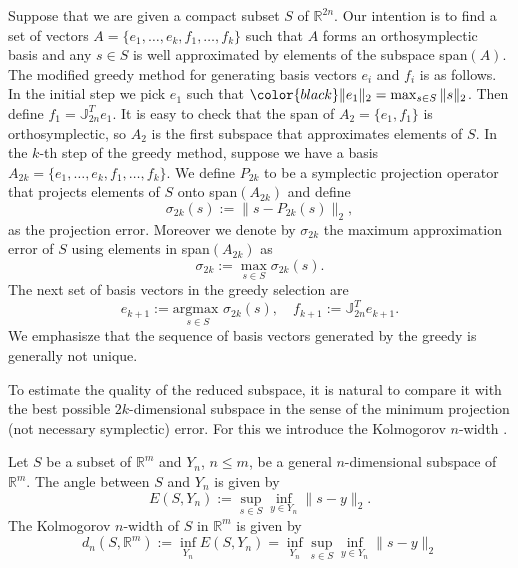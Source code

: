 \documentclass[final]{siamart}
\begin{document}
Suppose that we are given a compact subset $S$ of $\mathbb R^{2n}$. Our intention is to find a set of vectors $A=\{e_1,\dots,e_k,f_1,\dots,f_k\}$ such that $A$ forms {{\color{black}} an orthosymplectic} basis and any $s\in S$ is well approximated by elements of the subspace span$(A)$. The modified greedy method for generating basis vectors $e_i$ and $f_i$ is as follows. In the initial step we pick $e_1$ such that ${\color{black}} \|e_1\|_2 = \max_{s\in S} \|s\|_2$. Then define $f_1 = \mathbb{J}_{2n}^T e_1$. It is easy to check that the span of $A_2 = \{e_1,f_1\}$ is {{\color{black}} orthosymplectic}, so $A_2$ is the first subspace that approximates elements of $S$. In the $k$-th step of the greedy method, suppose we have a basis $A_{2k} = \{ e_1,\dots, e_k , f_1,\dots ,f_k \}$. We define $P_{2k}$ to be a symplectic projection operator that projects elements of $S$ onto span$(A_{2k})$ and define
\begin{equation} \label{eq:new1}
	\sigma_{2k}(s) := \|s-P_{2k}(s)\|_2,
\end{equation}
as the projection error. Moreover we denote by $\sigma_{2k}$ the maximum approximation error of $S$ using elements in span$(A_{2k})$ as
\begin{equation} \label{eq:new2}
	\sigma_{2k} := \max_{s\in S} \sigma_{2k}(s).
\end{equation}
The next set of basis vectors in the greedy selection are
\begin{equation} \label{eq:new3}
	e_{k+1} := \underset{s\in S}{\text{argmax }}\sigma_{2k}(s), \quad f_{k+1} := \mathbb{J}_{2n}^T e_{k+1}.
\end{equation}
We emphasisze that the sequence of basis vectors generated by the greedy is generally not unique. 

To estimate the quality of the reduced subspace, it is natural to compare it with the best possible $2k$-dimensional subspace in the sense of the minimum projection (not necessary symplectic) error. For this we introduce the Kolmogorov $n$-width \cite{Kolmogoroff:1936fj,Pinkus:1985vy}.

\begin{definition}
Let $S$ be a subset of $\mathbb R^{m}$ and $Y_n$, $n\leq m$, be a general $n$-dimensional subspace of $\mathbb R^{m}$. The angle between $S$ and $Y_n$ is given by
\begin{equation} \label{eq:new4}
	E(S,Y_n) := \sup_{s\in S} \inf_{y\in Y_n} \|s-y\|_2.
\end{equation}
The Kolmogorov $n$-width of $S$ in $\mathbb R^m$ is given by
\begin{equation} \label{eq:new5}
	d_{n}(S,\mathbb{R}^m) := \inf_{Y_n} E(S,Y_n) = \inf_{Y_n} \sup_{s\in S} \inf_{y\in Y_n} \|s-y\|_2
\end{equation}
\end{definition}
\end{document}
